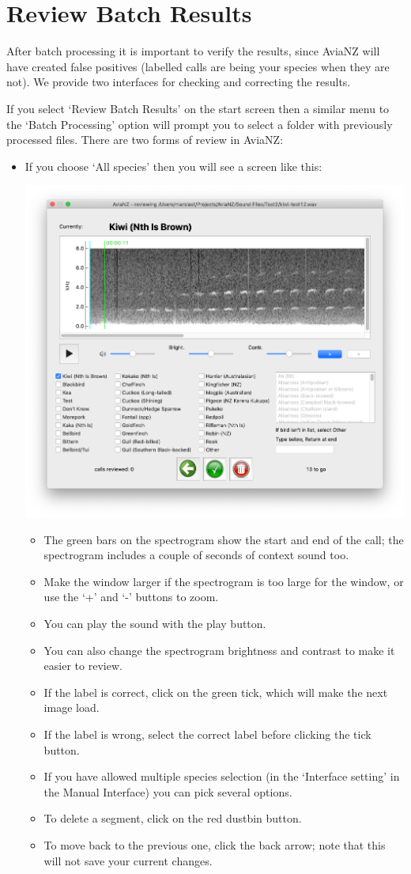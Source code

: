 \documentclass{article}
\begin{document}
\section{Review Batch Results}\label{sec:review}

After batch processing it is important to verify the results, since AviaNZ will have created false positives (labelled calls are being your species when they are not). We provide two interfaces for checking and correcting the results. 

If you select `Review Batch Results' on the start screen then a similar menu to the `Batch Processing' option will prompt you to select a folder with previously processed files. There are two forms of review in AviaNZ:

\begin{itemize}
\item If you choose `All species' then you will see a screen like this:
\begin{center}
	\includegraphics[width=.6\textwidth]{Figs/review1}
\end{center}

\begin{itemize}
\item The green bars on the spectrogram show the start and end of the call; the spectrogram includes a couple of seconds of context sound too. 
\item Make the window larger if the spectrogram is too large for the window, or use the `+' and `-' buttons to zoom. 
\item You can play the sound with the play button. 
\item You can also change the spectrogram brightness and contrast to make it easier to review. 
\item If the label is correct, click on the green tick, which will make the next image load. 
\item If the label is wrong, select the correct label before clicking the tick button. 
\item If you have allowed multiple species selection (in the `Interface setting' in the Manual Interface) you can pick several options. 
\item To delete a segment, click on the red dustbin button. 
\item To move back to the previous one, click the back arrow; note that this will not save your current changes. 
\end{itemize}


\end{itemize}
\end{document}

